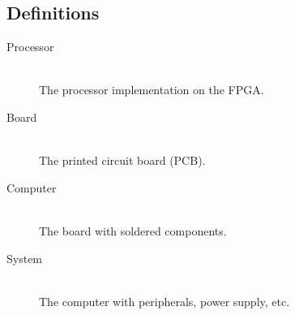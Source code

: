 \subsection{Definitions}

\begin{description}
    \item[Processor]
    \hfill\\
    The processor implementation on the FPGA.
    \item[Board]
    \hfill\\
    The printed circuit board (PCB).
    \item[Computer]
    \hfill\\
    The board with soldered components.
    \item[System]
    \hfill\\
    The computer with peripherals, power supply, etc.
\end{description}

